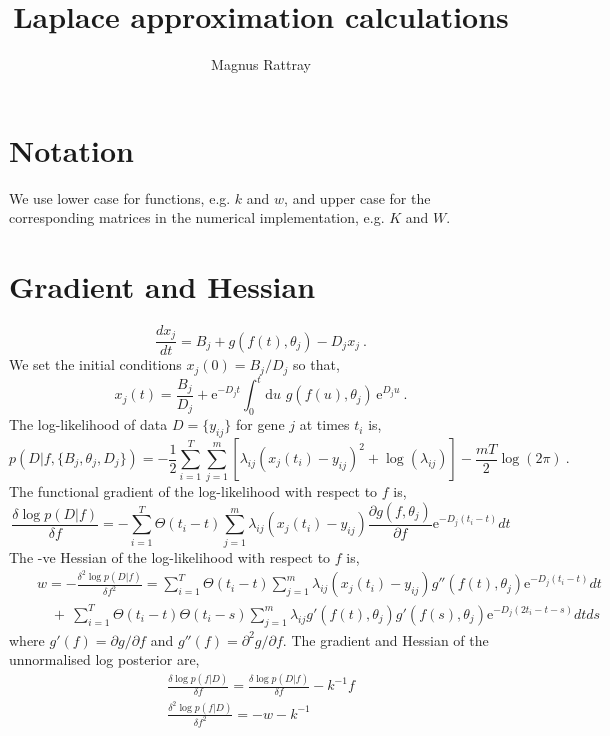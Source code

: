 \documentclass[10pt]{article}
\begin{document}
\title{Laplace approximation calculations}

\author{Magnus Rattray}

\maketitle

\section*{Notation}

We use lower case for functions, e.g. $k$ and $w$, and upper case 
for the corresponding matrices in the numerical implementation,
e.g. $K$ and $W$.

\section{Gradient and Hessian}

\begin{equation}
\frac{dx_j}{dt} = B_j + g(f(t),\theta_j) - D_j x_j \ .
\end{equation}
We set the initial conditions $x_j(0)=B_j/D_j$ so that,
\begin{equation}
x_j(t) = \frac{B_j}{D_j} + \mathrm{e}^{-D_j t}\int_{0}^t \mathrm{d}u \, \, g(f(u),\theta_j) \, \mathrm{e}^{D_j u} \ .
\end{equation}
The log-likelihood of data $D = \{y_{ij}\}$ for gene $j$ at times $t_i$ is,
\begin{equation}
p(D|f,\{B_j,\theta_j,D_j\}) = -\frac{1}{2}\sum_{i=1}^T \sum_{j=1}^m \left[\lambda_{ij} 
\left( x_j(t_i) - y_{ij} \right)^2 + \log\left(\lambda_{ij}\right)\right] - \frac{mT}{2}\log(2\pi) \ .
\end{equation}
The functional
gradient of the log-likelihood with respect to $f$ is,
\begin{equation}
\frac{\delta \log p(D|f)}{\delta f} = -\sum_{i=1}^T \Theta(t_i - t)\sum_{j=1}^m \lambda_{ij} 
(x_j(t_i) - y_{ij})\frac{\partial g(f,\theta_j)}{\partial
  f} \mathrm{e}^{-D_j(t_i-t)}dt
\end{equation}
The -ve Hessian of the log-likelihood with respect to $f$ is,
\begin{eqnarray}
& & w = - \frac{\delta^2 \log p(D|f)}{\delta f^2} = \sum_{i=1}^T\Theta(t_i - t)\sum_{j=1}^m \lambda_{ij} 
(x_j(t_i) - y_{ij}) g''(f(t),\theta_j)\mathrm{e}^{-D_j(t_i-t)}dt 
\nonumber \\ & & \quad + \: \sum_{i=1}^T \Theta(t_i-t)\Theta(t_i-s)\sum_{j=1}^m \lambda_{ij} 
g'(f(t),\theta_j) g'(f(s),\theta_j) \mathrm{e}^{-D_j(2t_i-t-s)}dtds 
\end{eqnarray}
where $g'(f)=\partial g/\partial f$ and $g''(f)=\partial^2 g/\partial f$. The gradient and Hessian of the
unnormalised log posterior are,
\begin{eqnarray}
\frac{\delta \log p(f|D)}{\delta f} = \frac{\delta \log p(D|f)}{\delta
  f} - k^{-1}f \\
\frac{\delta^2 \log p(f|D)}{\delta f^2} = -w-k^{-1}
\end{eqnarray}
\end{document}
